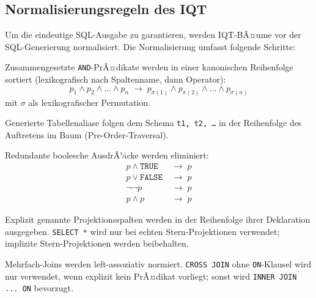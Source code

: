 \subsection{Normalisierungsregeln des IQT}
\label{subsec:iqt_norm}

Um die eindeutige SQL-Ausgabe zu garantieren, werden IQT-BÃ¤ume vor der
SQL-Generierung normalisiert. Die Normalisierung umfasst folgende Schritte:

\begin{regel}
\label{regel:pred_norm}
Zusammengesetzte \texttt{AND}-PrÃ¤dikate werden in einer kanonischen
Reihenfolge sortiert (lexikografisch nach Spaltenname, dann Operator):
\[
  p_1 \wedge p_2 \wedge \ldots \wedge p_n \;\rightarrow\;
  p_{\sigma(1)} \wedge p_{\sigma(2)} \wedge \ldots \wedge p_{\sigma(n)}
\]
mit $\sigma$ als lexikografischer Permutation.
\end{regel}

\begin{regel}
\label{regel:alias_norm}
Generierte Tabellenaliase folgen dem Schema \texttt{t1, t2, \ldots} in
der Reihenfolge des Auftretens im Baum (Pre-Order-Traversal).
\end{regel}

\begin{regel}
\label{regel:bool_simp}
Redundante boolesche AusdrÃ¼cke werden eliminiert:
\begin{align*}
  p \wedge \mathtt{TRUE} &\;\rightarrow\; p \\
  p \vee \mathtt{FALSE}  &\;\rightarrow\; p \\
  \neg\neg p             &\;\rightarrow\; p \\
  p \wedge p             &\;\rightarrow\; p
\end{align*}
\end{regel}

\begin{regel}
\label{regel:select_order}
Explizit genannte Projekti\-ons\-spalten werden in der Reihenfolge ihrer
Deklaration ausgegeben. \texttt{SELECT *} wird nur bei echten Stern-Projektionen
verwendet; implizite Stern-Projektionen werden beibehalten.
\end{regel}

\begin{regel}
\label{regel:join_canon}
Mehrfach-Joins werden left-assoziativ normiert.
\texttt{CROSS JOIN} ohne \texttt{ON}-Klausel wird nur verwendet, wenn
explizit kein PrÃ¤dikat vorliegt; sonst wird \texttt{INNER JOIN ... ON}
bevorzugt.
\end{regel}


